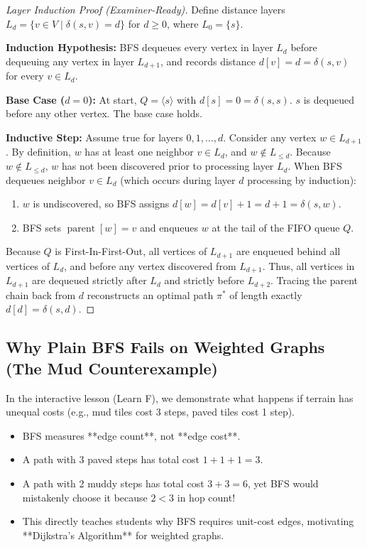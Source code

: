 \documentclass[11pt,a4paper]{article}
\theoremstyle{definition}
\begin{document}
\begin{proof}[Layer Induction Proof (Examiner-Ready)]
Define distance layers $L_d = \{v \in V \mid \delta(s, v) = d\}$ for $d \ge 0$, where $L_0 = \{s\}$.

\textbf{Induction Hypothesis:} BFS dequeues every vertex in layer $L_d$ before dequeuing any vertex in layer $L_{d+1}$, and records distance $d[v] = d = \delta(s, v)$ for every $v \in L_d$.

\textbf{Base Case ($d=0$):} At start, $Q = \langle s \rangle$ with $d[s] = 0 = \delta(s, s)$. $s$ is dequeued before any other vertex. The base case holds.

\textbf{Inductive Step:} Assume true for layers $0, 1, \dots, d$.
Consider any vertex $w \in L_{d+1}$. By definition, $w$ has at least one neighbor $v \in L_d$, and $w \notin L_{\le d}$.
Because $w \notin L_{\le d}$, $w$ has not been discovered prior to processing layer $L_d$.
When BFS dequeues neighbor $v \in L_d$ (which occurs during layer $d$ processing by induction):
\begin{enumerate}
  \item $w$ is undiscovered, so BFS assigns $d[w] = d[v] + 1 = d + 1 = \delta(s, w)$.
  \item BFS sets $\operatorname{parent}[w] = v$ and enqueues $w$ at the tail of the FIFO queue $Q$.
\end{enumerate}
Because $Q$ is First-In-First-Out, all vertices of $L_{d+1}$ are enqueued behind all vertices of $L_d$, and before any vertex discovered from $L_{d+1}$.
Thus, all vertices in $L_{d+1}$ are dequeued strictly after $L_d$ and strictly before $L_{d+2}$.
Tracing the parent chain back from $d$ reconstructs an optimal path $\pi^*$ of length exactly $d[d] = \delta(s, d)$.
\end{proof}

\subsection{Why Plain BFS Fails on Weighted Graphs (The Mud Counterexample)}
In the interactive lesson (Learn F), we demonstrate what happens if terrain has unequal costs (e.g., mud tiles cost 3 steps, paved tiles cost 1 step).
\begin{itemize}
  \item BFS measures **edge count**, not **edge cost**.
  \item A path with 3 paved steps has total cost $1 + 1 + 1 = 3$.
  \item A path with 2 muddy steps has total cost $3 + 3 = 6$, yet BFS would mistakenly choose it because $2 < 3$ in hop count!
  \item This directly teaches students why BFS requires unit-cost edges, motivating **Dijkstra's Algorithm** for weighted graphs.
\end{itemize}
\end{document}
